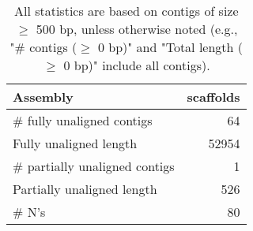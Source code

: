 \documentclass[12pt,a4paper]{article}
\begin{document}
\begin{table}[ht]
\begin{center}
\caption{All statistics are based on contigs of size $\geq$ 500 bp, unless otherwise noted (e.g., "\# contigs ($\geq$ 0 bp)" and "Total length ($\geq$ 0 bp)" include all contigs).}
\begin{tabular}{|l*{1}{|r}|}
\hline
Assembly & scaffolds \\ \hline
\# fully unaligned contigs & 64 \\ \hline
Fully unaligned length & 52954 \\ \hline
\# partially unaligned contigs & 1 \\ \hline
Partially unaligned length & 526 \\ \hline
\# N's & 80 \\ \hline
\end{tabular}
\end{center}
\end{table}
\end{document}
